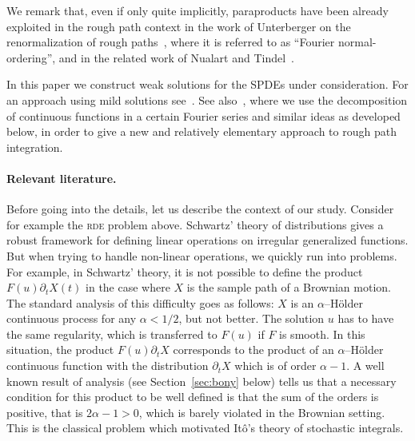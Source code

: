 \documentclass[11pt,a4paper]{article}
\theoremstyle{remark}
\begin{document}
\bigskip


We remark that, even if only quite implicitly, paraproducts  have been already exploited in the rough path context in the work of Unterberger on the renormalization of rough paths~\cite{Unterberger2010a, Unterberger2010}, where it is referred to as ``Fourier normal-ordering'', and in the related work of Nualart and Tindel~{\cite{Nualart2011}}.

In this paper we construct weak solutions for the SPDEs under consideration. For an approach using mild solutions see~\cite{Perkowski2014Thesis}. See also~\cite{Gubinelli2013}, where we use the decomposition of continuous functions in a certain Fourier series and similar ideas as developed below, in order to give a new and relatively elementary approach to rough path integration.






\paragraph{Relevant literature.}


Before going into the details, let us describe the context of our study. Consider for example the \textsc{rde} problem above. 
Schwartz' theory of distributions gives a robust framework for defining linear operations on irregular generalized functions. But when trying to handle non-linear operations, we quickly run into problems. For example, in Schwartz' theory, it is not possible to define the product $F(u) \partial_t X(t)$ in the case where $X$ is the sample path of a Brownian motion. The standard analysis of this difficulty goes as follows: $X$ is an $\alpha$--H\"older continuous process for any $\alpha<1/2$, but not better. The solution $u$ has to have the same regularity, which is transferred to $F(u)$ if $F$ is smooth. In this situation, the product $F(u)\partial_t X$ corresponds to the product of an $\alpha$--H\"older continuous function with the distribution $\partial_t X$ which is of order $\alpha-1$. A well known result of analysis (see Section~\ref{sec:bony} below) tells us that a necessary condition for this product to be well defined is that the sum of the orders is positive, that is $2\alpha-1>0$, which is barely violated in the Brownian setting.
This is the classical problem which motivated It\^o's theory of stochastic integrals.
\end{document}
